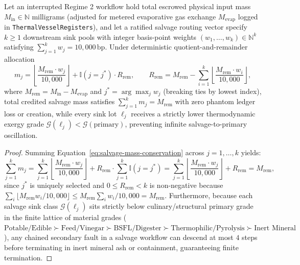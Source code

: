 \begin{theorem}
\label{thm:mass-conserving-salvage}
Let an interrupted Regime 2 workflow hold total escrowed physical input mass $M_{\mathrm{in}} \in
\mathbb{N}$ milligrams (adjusted for metered evaporative gas exchange $M_{\mathrm{evap}}$ logged
in \texttt{ThermalVesselRegisters}), and let a ratified salvage routing vector specify $k \ge 1$
downstream sink pools with integer basis-point weights $(w_1, \dots, w_k) \in \mathbb{N}^k$
satisfying $\sum_{j=1}^k w_j = 10{,}000\,\mathrm{bp}$. Under deterministic quotient-and-remainder
allocation
\begin{equation}
\label{eq:salvage-mass-conservation}
m_j = \left\lfloor \frac{M_{\mathrm{rem}} \cdot w_j}{10{,}000} \right\rfloor + \mathbb{I}(j = j^*)\cdot R_{\mathrm{rem}}, \qquad
R_{\mathrm{rem}} = M_{\mathrm{rem}} - \sum_{i=1}^k \left\lfloor \frac{M_{\mathrm{rem}} \cdot w_i}{10{,}000} \right\rfloor,
\end{equation}
where $M_{\mathrm{rem}} = M_{\mathrm{in}} - M_{\mathrm{evap}}$ and $j^* = \arg\max_j w_j$
(breaking ties by lowest index), total credited salvage mass satisfies
$\sum_{j=1}^k m_j = M_{\mathrm{rem}}$ with zero phantom ledger loss or creation, while every sink
lot $\ell_j$ receives a strictly lower thermodynamic exergy grade $\mathcal{G}(\ell_j) <
\mathcal{G}(\text{primary})$, preventing infinite salvage-to-primary oscillation.
\end{theorem}

\begin{proof}
Summing Equation~\ref{eq:salvage-mass-conservation} across $j = 1, \dots, k$ yields:
\[
\sum_{j=1}^k m_j = \sum_{j=1}^k \left\lfloor \frac{M_{\mathrm{rem}} \cdot w_j}{10{,}000} \right\rfloor
+ R_{\mathrm{rem}} \cdot \sum_{j=1}^k \mathbb{I}(j = j^*)
= \sum_{j=1}^k \left\lfloor \frac{M_{\mathrm{rem}} \cdot w_j}{10{,}000} \right\rfloor + R_{\mathrm{rem}} = M_{\mathrm{rem}},
\]
since $j^*$ is uniquely selected and $0 \le R_{\mathrm{rem}} < k$ is non-negative because
$\sum_i \lfloor M_{\mathrm{rem}} w_i / 10{,}000 \rfloor \le M_{\mathrm{rem}} \sum_i w_i / 10{,}000
= M_{\mathrm{rem}}$. Furthermore, because each salvage sink class $\mathcal{G}(\ell_j)$ sits
strictly below culinary/structural primary grade in the finite lattice of material grades
($\text{Potable/Edible} \succ \text{Feed/Vinegar} \succ \text{BSFL/Digester} \succ
\text{Thermophilic/Pyrolysis} \succ \text{Inert Mineral}$), any chained secondary fault in a
salvage workflow can descend at most $4$ steps before terminating in inert mineral ash or
containment, guaranteeing finite termination.
\end{proof}

